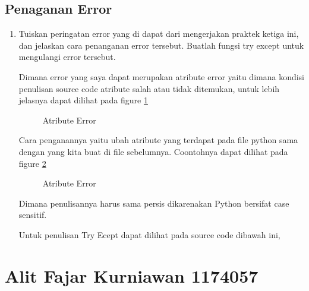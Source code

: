 \subsection{Penaganan Error}

\begin{enumerate}

	\item Tuiskan peringatan error yang di dapat dari mengerjakan praktek ketiga ini, dan jelaskan cara penanganan error tersebut. Buatlah fungsi try except untuk mengulangi error tersebut.

	\subitem Dimana error yang saya dapat merupakan atribute error yaitu dimana kondisi penulisan source code atribute salah atau tidak ditemukan, untuk lebih jelasnya dapat dilihat pada figure \ref{YNC4-3}

	\begin{figure}[ht]
		\caption{Atribute Error}
		\label{YNC4-3}
	\end{figure}

Cara penganannya yaitu ubah atribute yang terdapat pada file python sama dengan yang kita buat di file sebelumnya. Coontohnya dapat dilihat pada figure \ref{YNC4-4}

	\begin{figure}[ht]
		\caption{Atribute Error}
		\label{YNC4-4}
	\end{figure}

Dimana penulisannya harus sama persis dikarenakan Python bersifat case sensitif.

	\subitem Untuk penulisan Try Ecept dapat dilihat pada source code dibawah ini,

	


\end{enumerate}

\section{Alit Fajar Kurniawan  1174057}
